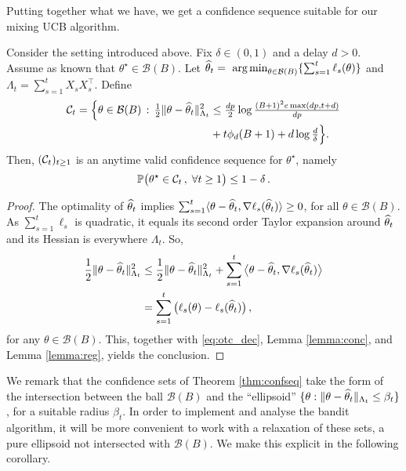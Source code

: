 Putting together what we have, we get a confidence sequence suitable for our mixing UCB algorithm. 

\begin{theorem}\label{thm:confseq}
	Consider the setting introduced above. Fix $\delta\in(0,1)$ and a delay $d>0$. Assume as known that $\theta^\star\in\mathcal B(B)$. Let $\widehat\theta_t = \mathop{\mbox{ arg\,min}}_{\theta\in\mathcal B(B)}\{\sum_{s=1}^{t}\ell_s(\theta)\}$ and $\Lambda_t = \sum_{s=1}^t X_s X_s^\top$. Define 
	\begin{align*}\mathcal{C}_t = \Big\{\theta\in\mathcal B(B)\,:\,\tfrac{1}{2}\|\theta-\widehat\theta_t\|_{\Lambda_t}^2&\leq \tfrac{dp}{2}\log\tfrac{(B+1)^2e\max(dp,t+d)}{dp} \\ &+ t\phi_d (B+1) + d\log\tfrac{d}{\delta}\Big\}.\end{align*}
	Then, $(\mathcal{C}_t)_{t\geq 1}$ is an anytime valid confidence sequence for $\theta^\star$, namely
	$$\mathbb P\big(\theta^\star\in\mathcal{C}_t\,,\;\forall t\geq 1\big)\leq 1-\delta\,.$$
\end{theorem}
\begin{proof}
	The optimality of $\widehat\theta_t$ implies $\sum_{s=1}^t\langle \theta-\widehat\theta_t,\nabla\ell_s(\widehat\theta_t)\rangle \geq 0$, for all $\theta\in\mathcal B(B)$. As  $\sum_{s=1}^t\ell_s$ is quadratic, it equals its second order Taylor expansion around $\widehat\theta_t$ and its Hessian is everywhere $\Lambda_t$. So,
	\begin{align*}\frac12\|\theta-\widehat\theta_t\|_{\Lambda_t}^2 &\leq \frac12\|\theta-\widehat\theta_t\|_{\Lambda_t}^2+\sum_{s=1}^t\big\langle \theta-\widehat\theta_t,\nabla\ell_s(\widehat\theta_t) \big\rangle\\
    &= \sum_{s=1}^t \big(\ell_s(\theta)-\ell_s(\widehat\theta_t)\big)\,,\end{align*} for any $\theta\in\mathcal B(B)$. This, together with \eqref{eq:otc_dec}, Lemma \ref{lemma:conc}, and Lemma \ref{lemma:reg}, yields the conclusion.
\end{proof}
We remark that the confidence sets of Theorem \ref{thm:confseq} take the form of the intersection between the ball $\mathcal B(B)$ and the ``ellipsoid'' $\{\theta:\|\theta-\widehat\theta_t\|_{\Lambda_t}\leq\beta_t\}$, for a suitable radius $\beta_t$. In order to implement and analyse the bandit algorithm, it will be more convenient to work with a relaxation of these sets, a pure ellipsoid not intersected with $\mathcal B(B)$. We make this explicit in the following corollary.
